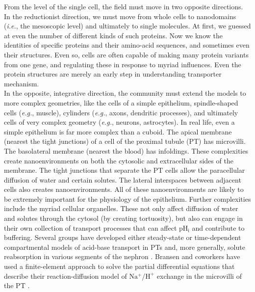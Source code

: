 \documentclass[fleqn,10pt]{physiome}
\begin{document}
From the level of the single cell, the field must move in two opposite directions. In the reductionist direction, we must move from whole cells to nanodomains (\emph{i.e.}, the mesoscopic level) and ultimately to single molecules. At first, we guessed at even the number of different kinds of such proteins. Now we know the identities of specific proteins and their amino-acid sequences, and sometimes even their structures. Even so, cells are often capable of making many protein variants from one gene, and regulating these in response to myriad influences. Even the protein structures are merely an early step in understanding transporter mechanism.\\

In the opposite, integrative direction, the community must extend the models to more complex geometries, like the cells of a simple epithelium, spindle-shaped cells (\emph{e.g.}, muscle), cylinders (\emph{e.g.}, axons, dendritic processes), and ultimately cells of very complex geometry (\emph{e.g.}, neurons, astrocytes). In real life, even a simple epithelium is far more complex than a cuboid. The apical membrane (nearest the tight junctions) of a cell of the proximal tubule (PT) has microvilli. The basolateral membrane (nearest the blood) has infoldings. These complexities create nanoenvironments on both the cytosolic and extracellular sides of the membrane. The tight junctions that separate the PT cells allow the paracellular diffusion of water and certain solutes. The lateral interspaces between adjacent cells also creates nanoenvironments. All of these nanoenvironments are likely to be extremely important for the physiology of the epithelium. Further complexities include the myriad cellular organelles. These not only affect diffusion of water and solutes through the cytosol (by creating tortuosity), but also can engage in their own collection of transport processes that can affect $\mathrm{pH_i}$ and contribute to buffering. Several groups have developed either steady-state or time-dependent compartmental models of acid-base transport in PTs and, more generally, solute reabsorption in various segments of the nephron \citep{thomas1994kinetic,krahn1996acid,thomas2006kidney,weinstein2007flow,weinstein2009modeling,layton2014mathematical,edwards2017cell}. Bransen and coworkers have used a finite-element approach to solve the partial differential equations that describe their reaction-diffusion model of $\mathrm{Na^+}$/$\mathrm{H^+}$ exchange in the microvilli of the PT \citep{brasen2014local}.\\
\end{document}
